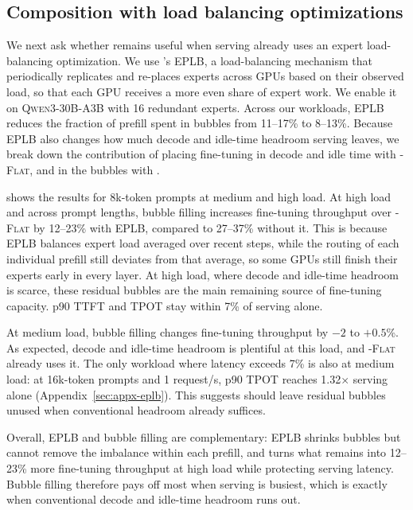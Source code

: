 \subsection{Composition with load balancing optimizations}
\label{sec:eval-eplb}

We next ask whether \sys remains useful when serving already uses an expert load-balancing optimization.
We use \vllm's \ac{EPLB}, a load-balancing  mechanism that periodically replicates and re-places experts across GPUs based on their observed load, so that each GPU receives a more even share of expert work.
We enable it on \textsc{Qwen3-30B-A3B} with 16 redundant experts.
Across our workloads, \ac{EPLB} reduces the fraction of prefill spent in bubbles from 11--17\% to 8--13\%.
Because \ac{EPLB} also changes how much decode and idle-time headroom serving leaves, we break down the contribution of placing fine-tuning in decode and idle time with \sys-\textsc{Flat}, and in the bubbles with \sys.

 shows the results for 8k-token prompts at medium and high load.
At high load and across prompt lengths, bubble filling increases fine-tuning throughput over \sys-\textsc{Flat} by 12--23\% with \ac{EPLB}, compared to 27--37\% without it.
This is because \ac{EPLB} balances expert load averaged over recent steps, while the routing of each individual prefill still deviates from that average, so some GPUs still finish their experts early in every layer.
At high load, where decode and idle-time headroom is scarce, these residual bubbles are the main remaining source of fine-tuning capacity.
p90 \ac{TTFT} and \ac{TPOT} stay within 7\% of serving alone.

At medium load, bubble filling changes fine-tuning throughput by $-2$ to $+0.5$\%.
As expected, decode and idle-time headroom is plentiful at this load, and \sys-\textsc{Flat} already uses it.
The only workload where latency exceeds 7\% is also at medium load: at 16k-token prompts and 1 request/s, p90 \ac{TPOT} reaches 1.32$\times$ serving alone (Appendix~\ref{sec:appx-eplb}).
This suggests \sys should leave residual bubbles unused when conventional headroom already suffices.

Overall, \ac{EPLB} and bubble filling are complementary: \ac{EPLB} shrinks bubbles but cannot remove the imbalance within each prefill, and \sys turns what remains into 12--23\% more fine-tuning throughput at high load while protecting serving latency.
Bubble filling therefore pays off most when serving is busiest, which is exactly when conventional decode and idle-time headroom runs out.
